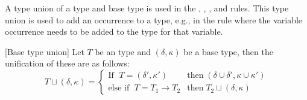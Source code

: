 \documentclass[../../master.tex]{subfiles}
\begin{document}
A type union of a type and base type is used in the , , , and  rules.
This type union is used to add an occurrence to a type, e.g., in the  rule where the variable occurrence needs to be added to the type for that variable.
\begin{definition}{[Base type union]}
	Let $T$ be an type and $(\delta,\kappa)$ be a base type, then the unification of these are as follows:
	\begin{equation*}
		T\sqcup (\delta,\kappa)=
		\left\{\begin{matrix}
			\mbox{If } \; T=(\delta',\kappa')  & \mbox{then} \; (\delta\cup\delta',\kappa\cup\kappa')\\
			\mbox{else if } \; T=T_1\rightarrow T_2 & \mbox{then} \; T_2\sqcup (\delta,\kappa)
		\end{matrix}\right.
	\end{equation*}
\end{definition}
\end{document}
